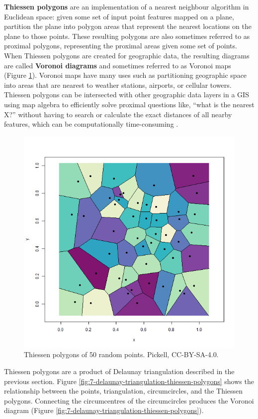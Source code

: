 \documentclass[
]{book}
\begin{document}
\textbf{Thiessen polygons} are an implementation of a nearest neighbour algorithm in Euclidean space: given some set of input point features mapped on a plane, partition the plane into polygon areas that represent the nearest locations on the plane to those points. These resulting polygons are also sometimes referred to as proximal polygons, representing the proximal areas given some set of points. When Thiessen polygons are created for geographic data, the resulting diagrams are called \textbf{Voronoi diagrams} and sometimes referred to as Voronoi maps (Figure \ref{fig:7-2d-thiessen-polygons}). Voronoi maps have many uses such as partitioning geographic space into areas that are nearest to weather stations, airports, or cellular towers. Thiessen polygons can be intersected with other geographic data layers in a GIS using map algebra to efficiently solve proximal questions like, ``what is the nearest X?'' without having to search or calculate the exact distances of all nearby features, which can be computationally time-consuming \citep{okabe_nearest_1994}.

\begin{figure}
\includegraphics[width=0.75\linewidth]{images/07-2d-thiessen-polygons} \caption{Thiessen polygons of 50 random points. Pickell, CC-BY-SA-4.0.}\label{fig:7-2d-thiessen-polygons}
\end{figure}

Thiessen polygons are a product of Delaunay triangulation described in the previous section. Figure \ref{fig:7-delaunay-triangulation-thiessen-polygons} shows the relationship between the points, triangulation, circumcircles, and the Thiessen polygons. Connecting the circumcentres of the circumcircles produces the Voronoi diagram (Figure \ref{fig:7-delaunay-triangulation-thiessen-polygons}).
\end{document}
